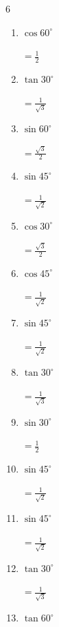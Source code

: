 \begin{multicols}{6}
\begin{enumerate}
        $\displaystyle =\frac{\sqrt{3}}{2}$

  \item $\displaystyle \cos{60^\circ}$

        $\displaystyle =\frac{1}{2}$

\columnbreak %

  \item $\displaystyle \tan{30^\circ}$

        $\displaystyle =\frac{1}{\sqrt{3}}$

  \item $\displaystyle \sin{60^\circ}$

        $\displaystyle =\frac{\sqrt{3}}{2}$

  \item $\displaystyle \sin{45^\circ}$

        $\displaystyle =\frac{1}{\sqrt{2}}$

  \item $\displaystyle \cos{30^\circ}$

        $\displaystyle =\frac{\sqrt{3}}{2}$

  \item $\displaystyle \cos{45^\circ}$

        $\displaystyle =\frac{1}{\sqrt{2}}$

  \item $\displaystyle \sin{45^\circ}$

        $\displaystyle =\frac{1}{\sqrt{2}}$

  \item $\displaystyle \tan{30^\circ}$

        $\displaystyle =\frac{1}{\sqrt{3}}$

  \item $\displaystyle \sin{30^\circ}$

        $\displaystyle =\frac{1}{2}$

  \item $\displaystyle \sin{45^\circ}$

        $\displaystyle =\frac{1}{\sqrt{2}}$

  \item $\displaystyle \sin{45^\circ}$

        $\displaystyle =\frac{1}{\sqrt{2}}$

  \item $\displaystyle \tan{30^\circ}$

        $\displaystyle =\frac{1}{\sqrt{3}}$

  \item $\displaystyle \tan{60^\circ}$


\end{enumerate}
\end{multicols}
